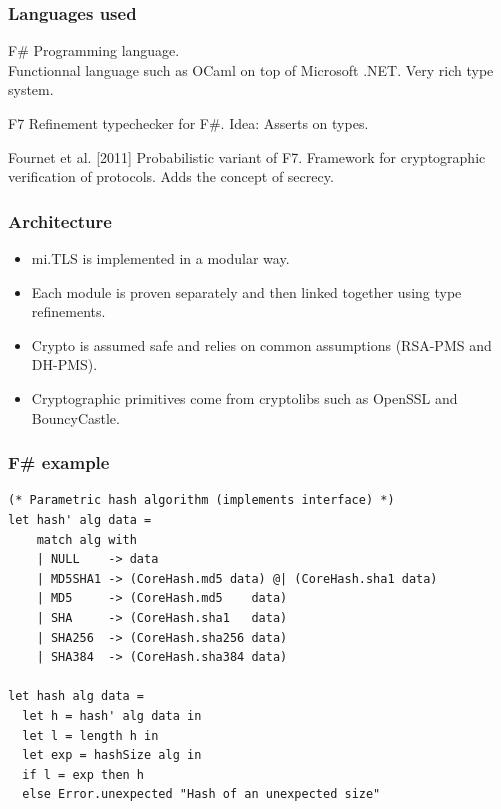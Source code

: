 \documentclass{beamer}
\begin{document}
\begin{frame}
    \frametitle{Languages used}
    \begin{block}{F\#}
        Programming language.\\
        Functionnal language such as OCaml on top of Microsoft .NET.
        Very rich type system.
    \end{block}

    \begin{block}{F7}
        Refinement typechecker for F\#.
        Idea: Asserts on types.
    \end{block}

    \begin{block}{Fournet et al. [2011]}
        Probabilistic variant of F7.
        Framework for cryptographic verification of protocols.
        Adds the concept of secrecy.
    \end{block}
\end{frame}

\begin{frame}
    \frametitle{Architecture}
    
    \begin{itemize}
        \item mi.TLS is implemented in a modular way.
        \item Each module is proven separately and then linked together using type refinements.
        \vfill
        \item Crypto is assumed safe and relies on common assumptions (RSA-PMS and DH-PMS).
        \item Cryptographic primitives come from cryptolibs such as OpenSSL and BouncyCastle.
    \end{itemize}
\end{frame}



\begin{frame}[fragile]
    \frametitle{F\# example}

    \begin{lstlisting}
(* Parametric hash algorithm (implements interface) *)
let hash' alg data =
    match alg with
    | NULL    -> data
    | MD5SHA1 -> (CoreHash.md5 data) @| (CoreHash.sha1 data)
    | MD5     -> (CoreHash.md5    data)
    | SHA     -> (CoreHash.sha1   data)
    | SHA256  -> (CoreHash.sha256 data)
    | SHA384  -> (CoreHash.sha384 data)

let hash alg data =
  let h = hash' alg data in
  let l = length h in
  let exp = hashSize alg in
  if l = exp then h
  else Error.unexpected "Hash of an unexpected size"
    \end{lstlisting}
\end{frame}
\end{document}
